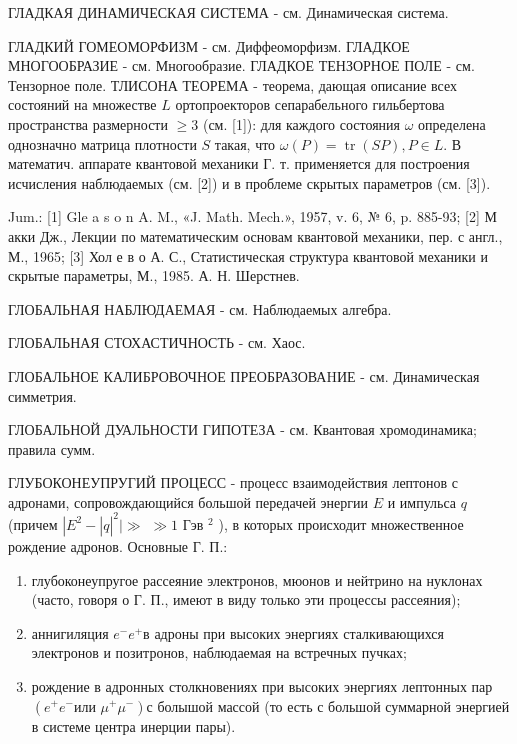 \documentclass[10pt]{article}
\begin{document}
ГЛАДКАЯ ДИНАМИЧЕСКАЯ СИСТЕМА - см. Динамическая система.



ГЛАДКИЙ ГОМЕОМОРФИЗМ - см. Диффеоморфизм. ГЛАДКОЕ МНОГООБРАЗИЕ - см. Многообразие. ГЛАДКОЕ ТЕНЗОРНОЕ ПОЛЕ - см. Тензорное поле. ТЛИСОНА ТЕОРЕМА - теорема, дающая описание всех состояний на множестве $L$ ортопроекторов сепарабельного гильбертова пространства размерности $\geqslant 3$ (см. [1]): для каждого состояния $\omega$ определена однозначно матрица плотности $S$ такая, что $\omega(P)=\operatorname{tr}(S P), P \in L$. В математич. аппарате квантовой механики Г. т. применяется для построения исчисления наблюдаемых (см. [2]) и в проблеме скрытых параметров (см. [3]).



Jum.: [1] Gle a s o n A. M., «J. Math. Mech.», 1957, v. 6, № 6, p. 885-93; [2] М акки Дж., Лекции по математическим основам квантовой механики, пер. с англ., М., 1965; [3] Хол е в о А. С., Статистическая структура квантовой механики и скрытые параметры, М., 1985. А. Н. Шерстнев.



ГЛОБАЛЬНАЯ НАБЛЮДАЕМАЯ - см. Наблюдаемых алгебра.



ГЛОБАЛЬНАЯ СТОХАСТИЧНОСТЬ - см. Хаос.



ГЛОБАЛЬНОЕ КАЛИБРОВОЧНОЕ ПРЕОБРАЗОВАHИЕ - см. Динамическая симметрия.



ГЛОБАЛЬНОЙ ДУАЛЬНОСТИ ГИПОТЕЗА - см. Квантовая хромодинамика; правила сумм.



ГЛУБОКОНЕУПРУГИЙ ПРОЦЕСС - процесс взаимодействия лептонов с адронами, сопровождающийся большой передачей энергии $E$ и импульса $q$ (причем $\left.\left|E^{2}-\right| q\right|^{2} \mid \gg$ $\gg 1$ Гэв ${ }^{2}$ ), в которых происходит множественное рождение адронов. Основные Г. П.:



\begin{enumerate}

  \item глубоконеупругое рассеяние электронов, мюонов и нейтрино на нуклонах (часто, говоря о Г. П., имеют в виду только эти процессы рассеяния);



  \item аннигиляция $e^{-} e^{+}$в адроны при высоких энергиях сталкивающихся электронов и позитронов, наблюдаемая на встречных пучках;



  \item рождение в адронных столкновениях при высоких энергиях лептонных пар $\left(e^{+} e^{-}\right.$или $\left.\mu^{+} \mu^{-}\right)$с болышой массой (то есть с большой суммарной энергией в системе центра инерции пары).



\end{enumerate}
\end{document}
